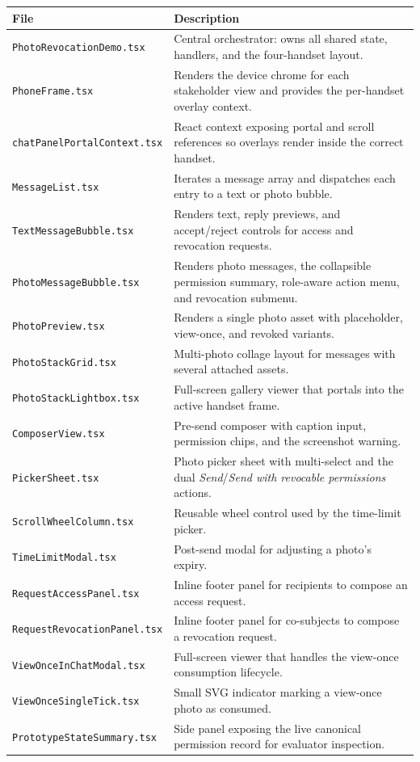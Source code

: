 \begin{center}
\small
\begin{tabular}{@{}P{5.2cm}P{8.4cm}@{}}
\hline
\textbf{File} & \textbf{Description} \\
\hline
\texttt{PhotoRevocationDemo.tsx} & Central orchestrator: owns all shared state, handlers, and the four-handset layout. \\
\texttt{PhoneFrame.tsx} & Renders the device chrome for each stakeholder view and provides the per-handset overlay context. \\
\texttt{chatPanelPortalContext.tsx} & React context exposing portal and scroll references so overlays render inside the correct handset. \\
\texttt{MessageList.tsx} & Iterates a message array and dispatches each entry to a text or photo bubble. \\
\texttt{TextMessageBubble.tsx} & Renders text, reply previews, and accept/reject controls for access and revocation requests. \\
\texttt{PhotoMessageBubble.tsx} & Renders photo messages, the collapsible permission summary, role-aware action menu, and revocation submenu. \\
\texttt{PhotoPreview.tsx} & Renders a single photo asset with placeholder, view-once, and revoked variants. \\
\texttt{PhotoStackGrid.tsx} & Multi-photo collage layout for messages with several attached assets. \\
\texttt{PhotoStackLightbox.tsx} & Full-screen gallery viewer that portals into the active handset frame. \\
\texttt{ComposerView.tsx} & Pre-send composer with caption input, permission chips, and the screenshot warning. \\
\texttt{PickerSheet.tsx} & Photo picker sheet with multi-select and the dual \emph{Send}/\emph{Send with revocable permissions} actions. \\
\texttt{ScrollWheelColumn.tsx} & Reusable wheel control used by the time-limit picker. \\
\texttt{TimeLimitModal.tsx} & Post-send modal for adjusting a photo's expiry. \\
\texttt{RequestAccessPanel.tsx} & Inline footer panel for recipients to compose an access request. \\
\texttt{RequestRevocationPanel.tsx} & Inline footer panel for co-subjects to compose a revocation request. \\
\texttt{ViewOnceInChatModal.tsx} & Full-screen viewer that handles the view-once consumption lifecycle. \\
\texttt{ViewOnceSingleTick.tsx} & Small SVG indicator marking a view-once photo as consumed. \\
\texttt{PrototypeStateSummary.tsx} & Side panel exposing the live canonical permission record for evaluator inspection. \\
\hline
\end{tabular}
\end{center}

